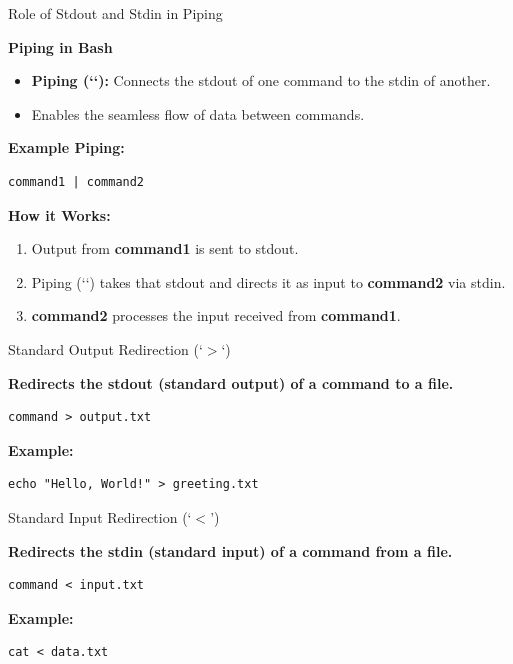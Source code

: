 \documentclass{beamer}
\begin{document}
\begin{frame}[fragile]{Role of Stdout and Stdin in Piping}

  \textbf{Piping in Bash}

  \begin{itemize}
      \item \textbf{Piping (`\text{\textbar}`):} Connects the stdout of one command to the stdin of another.
    \item Enables the seamless flow of data between commands.
  \end{itemize}

  \textbf{Example Piping:}

  \begin{lstlisting}[frame=none]
  command1 | command2
  \end{lstlisting}

  \textbf{How it Works:}

  \begin{enumerate}
    \item Output from \textbf{command1} is sent to stdout.
    \item Piping (`\text{\textbar}`) takes that stdout and directs it as input to \textbf{command2} via stdin.
    \item \textbf{command2} processes the input received from \textbf{command1}.
  \end{enumerate}
\end{frame}

\begin{frame}[fragile]{Standard Output Redirection (`$>$`)}

  \textbf{Redirects the stdout (standard output) of a command to a file.}

  \begin{lstlisting}[frame=none]
  command > output.txt
  \end{lstlisting}

  \textbf{Example:}

  \begin{lstlisting}[frame=none]
  echo "Hello, World!" > greeting.txt
  \end{lstlisting}

\end{frame}

\begin{frame}[fragile]{Standard Input Redirection (`$<$')}

  \textbf{Redirects the stdin (standard input) of a command from a file.}

  \begin{lstlisting}[frame=none]
  command < input.txt
  \end{lstlisting}

  \textbf{Example:}

  \begin{lstlisting}[frame=none]
  cat < data.txt
  \end{lstlisting}

\end{frame}
\end{document}
